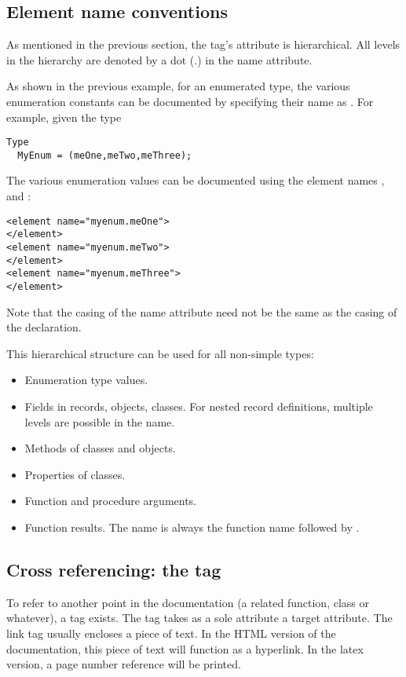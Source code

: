 \subsection{Element name conventions}
As mentioned in the previous section, the  tag's 
attribute is hierarchical. All levels in the hierarchy are denoted by a dot
(.) in the name attribute. 

As shown in the previous example, for an enumerated type, the various
enumeration constants can be documented by specifying their name as
. For example, given the type
\begin{verbatim}
Type
  MyEnum = (meOne,meTwo,meThree);
\end{verbatim}
The various enumeration values can be documented using the element names
,  and :
\begin{verbatim}
<element name="myenum.meOne">
</element>
<element name="myenum.meTwo">
</element>
<element name="myenum.meThree">
</element>
\end{verbatim}
Note that the casing of the name attribute need not be the same as the
casing of the declaration.

This hierarchical structure can be used for all non-simple types: 
\begin{itemize}
\item Enumeration type values.
\item Fields in records, objects, classes. For nested record definitions,
multiple levels are possible in the name.
\item Methods of classes and objects.
\item Properties of classes.
\item Function and procedure arguments. 
\item Function results. The name is always the function name followed by
.
\end{itemize}

\subsection{Cross referencing: the  tag}
To refer to another point in the documentation (a related function, class or
whatever), a  tag exists. The  tag takes as a sole
attribute a target  attribute. The link tag usually encloses a
piece of text. In the HTML version of the documentation, this piece of text
will function as a hyperlink. In the latex version, a page number reference
will be printed. 

